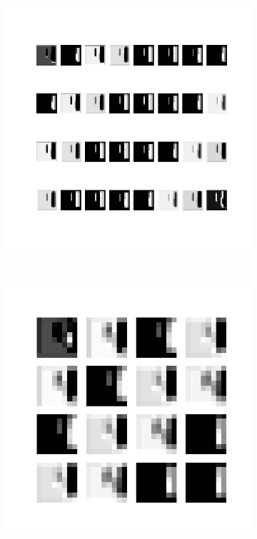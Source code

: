 \begin{figure}
\begin{subfigure}[b]{0.4\linewidth}
        \includegraphics[width=\linewidth]{images/cae_online_lstm/caelstm_section_cae_training_block_map_10000_model_feature_maps_map_1_0_2.png}
    \end{subfigure}
    \\[-0.5cm]
    \begin{subfigure}[b]{0.4\linewidth}
        \includegraphics[width=\linewidth]{images/cae_online_lstm/caelstm_section_cae_training_block_map_10000_model_feature_maps_map_1_0_1.png}

\end{subfigure}
\end{figure}
